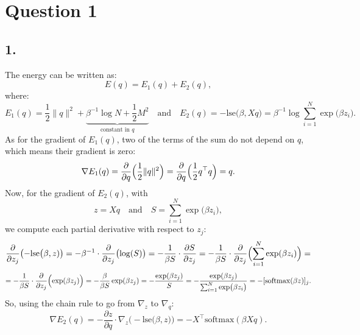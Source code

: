 \documentclass[12pt,a4paper]{article}
\begin{document}
    \setcounter{page}{2}
    \setcounter{secnumdepth}{0} %
    \setlength{\parskip}{0em}

    \newlength{\imagewidth} %
    \setlength{\imagewidth}{8cm} %


    \section{Question 1}
    \subsection{1.}
        The energy can be written as:
        \[
            E(q) = E_{1}(q) + E_{2}(q),
        \]
        where:
        \[
            E_1(q) = \frac{1}{2} \|q\|^{2} + \underbrace{\beta^{-1} \log N + \frac{1}{2} M^{2}}_{\text{constant in }q}
            \quad \text{and} \quad
            E_{2}(q) = -\mathrm{lse} \bigl( \beta, Xq \bigr) = \beta^{-1} \log \sum_{i=1}^N \exp \bigl( \beta z_{i} \bigr).
        \]
        As for the gradient of \(E_{1}(q)\), two of the terms of the sum do not depend on \(q\), which means their gradient is zero:
        \[
            \nabla E_{1}(q)
            = \frac{\partial}{\partial q} \Bigl( \frac{1}{2} \|q\|^{2} \Bigr)
            = \frac{\partial}{\partial q} \Bigl( \frac{1}{2} q^\top q \Bigr)
            = q.
        \]
        Now, for the gradient of \(E_{2}(q)\), with
        \[
            z = Xq
            \quad \text{and} \quad
            S = \sum_{i=1}^N \exp \bigl( \beta z_{i} \bigr),
        \]
        we compute each partial derivative with respect to \(z_j\):
        \[
            \frac{\partial}{\partial z_j} \bigl( -\mathrm{lse} \bigl( \beta, z) \bigr)
            = -\beta^{-1} \cdot \frac{\partial}{\partial z_j} \bigl( \log(S) \bigr)
            = -\frac{1}{\beta S} \cdot \frac{\partial S}{\partial z_j}
            = -\frac{1}{\beta S} \cdot \frac{\partial}{\partial z_j} \Bigl( \sum_{i=1}^{N} \exp(\beta z_{i}) \Bigr) =
        \]
        \[
            = -\frac{1}{\beta S} \cdot \frac{\partial}{\partial z_j} \Bigl( \exp(\beta z_{j}) \Bigr)
            = -\frac{\beta}{\beta S} \exp(\beta z_{j})
            = -\frac{\exp(\beta z_{j})}{S}
            = -\frac{\exp(\beta z_{j})}{\sum_{i=1}^N \exp \bigl( \beta z_{i} \bigr)}
            = -[\mathrm{softmax}(\beta z)]_{j}.
        \]
        So, using the chain rule to go from \(\nabla_{z}\) to \(\nabla_{q}\):
        \[
            \nabla E_{2}(q)
            = -\frac{\partial z}{\partial q} \cdot \nabla_{z} \bigl(-\mathrm{lse} \bigl( \beta, z \bigr) \bigr)
            = -X^\top \mathrm{softmax}(\beta X q).
        \]
\end{document}
